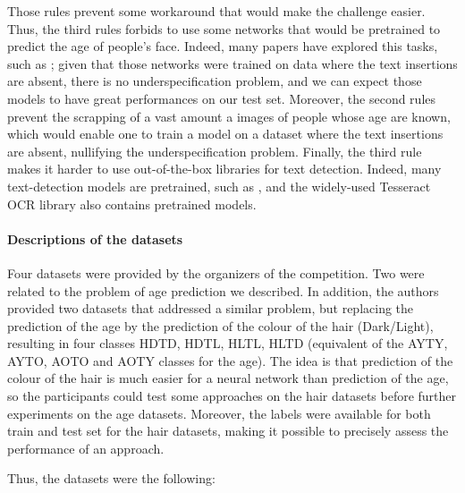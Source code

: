 \documentclass[sigconf, nonacm]{acmart}
\begin{document}
Those rules prevent some workaround that would make the challenge easier. Thus, the third rules forbids to use some networks that would be pretrained to predict the age of people's face. Indeed, many papers have explored this tasks, such as \cite{qawaqneh_deep_2017, nga_transfer_2020, hiba_hierarchical_2021}; given that those networks were trained on data where the text insertions are absent, there is no underspecification problem, and we can expect those models to have great performances on our test set. Moreover, the second rules prevent the scrapping of a vast amount a images of people whose age are known, which would enable one to train a model on a dataset where the text insertions are absent, nullifying the underspecification problem. Finally, the third rule makes it harder to use out-of-the-box libraries for text detection. Indeed, many text-detection models are pretrained, such as \cite{li_trocr_2022, lin_transferring_2022}, and the widely-used Tesseract OCR library \cite{noauthor_tesseract_2023} also contains pretrained models. 

\paragraph{Descriptions of the datasets} Four datasets were provided by the organizers of the competition. Two were related to the problem of age prediction we described. In addition, the authors provided two datasets that addressed a similar problem, but replacing the prediction of the age by the prediction of the colour of the hair (Dark/Light), resulting in four classes HDTD, HDTL, HLTL, HLTD (equivalent of the AYTY, AYTO, AOTO and AOTY classes for the age). The idea is that prediction of the colour of the hair is much easier for a neural network than prediction of the age, so the participants could test some approaches on the hair datasets before further experiments on the age datasets. Moreover, the labels were available for both train and test set for the hair datasets, making it possible to precisely assess the performance of an approach. 

Thus, the datasets were the following:
\end{document}
